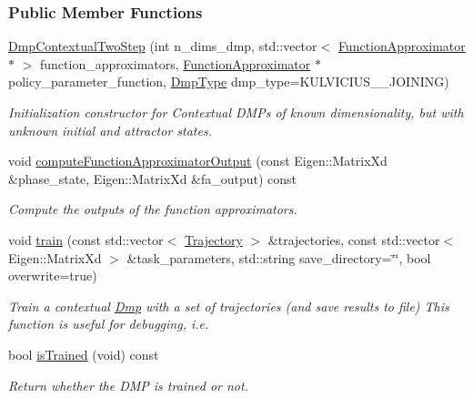 \subsubsection*{Public Member Functions}
\begin{DoxyCompactItemize}
\item 
\hyperlink{classDmpBbo_1_1DmpContextualTwoStep_ae88d955cf82c0648ee8d304ab227be44}{Dmp\+Contextual\+Two\+Step} (int n\+\_\+dims\+\_\+dmp, std\+::vector$<$ \hyperlink{classDmpBbo_1_1FunctionApproximator}{Function\+Approximator} $\ast$ $>$ function\+\_\+approximators, \hyperlink{classDmpBbo_1_1FunctionApproximator}{Function\+Approximator} $\ast$policy\+\_\+parameter\+\_\+function, \hyperlink{group__Dmps_gaccba8d09ec99ae66e469b3511bb232a4}{Dmp\+Type} dmp\+\_\+type=K\+U\+L\+V\+I\+C\+I\+U\+S\+\_\+\_\+\+J\+O\+I\+N\+I\+N\+G)
\begin{DoxyCompactList}\small\item\em Initialization constructor for Contextual D\+M\+Ps of known dimensionality, but with unknown initial and attractor states. \end{DoxyCompactList}\item 
void \hyperlink{classDmpBbo_1_1DmpContextualTwoStep_a89078b732a4579130e24e3bc59c1713c}{compute\+Function\+Approximator\+Output} (const Eigen\+::\+Matrix\+Xd \&phase\+\_\+state, Eigen\+::\+Matrix\+Xd \&fa\+\_\+output) const 
\begin{DoxyCompactList}\small\item\em Compute the outputs of the function approximators. \end{DoxyCompactList}\item 
void \hyperlink{classDmpBbo_1_1DmpContextualTwoStep_af8c0bd87ecb6390997b8839e3c5bb6c8}{train} (const std\+::vector$<$ \hyperlink{classDmpBbo_1_1Trajectory}{Trajectory} $>$ \&trajectories, const std\+::vector$<$ Eigen\+::\+Matrix\+Xd $>$ \&task\+\_\+parameters, std\+::string save\+\_\+directory=\char`\"{}\char`\"{}, bool overwrite=true)
\begin{DoxyCompactList}\small\item\em Train a contextual \hyperlink{classDmpBbo_1_1Dmp}{Dmp} with a set of trajectories (and save results to file) This function is useful for debugging, i.\+e. \end{DoxyCompactList}\item 
bool \hyperlink{classDmpBbo_1_1DmpContextualTwoStep_a178135f623d9b9058870851a53299c6e}{is\+Trained} (void) const 
\begin{DoxyCompactList}\small\item\em Return whether the D\+M\+P is trained or not. \end{DoxyCompactList}\end{DoxyCompactItemize}
